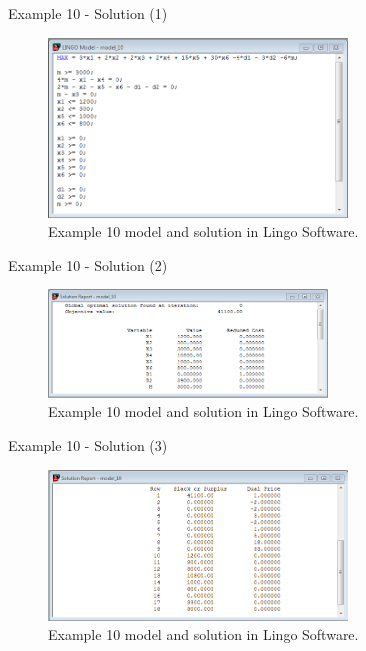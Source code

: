 \begin{frame}{Example 10 - Solution (1)}
\begin{figure}
    \includegraphics[width=300px]{slides/ex10/screenshot_a.png}
    \caption{Example 10 model and solution in Lingo Software.}
\end{figure}
\end{frame}

\begin{frame}{Example 10 - Solution (2)}
\begin{figure}
    \includegraphics[width=280px]{slides/ex10/screenshot_b.png}
    \caption{Example 10 model and solution in Lingo Software.}
\end{figure}
\end{frame}

\begin{frame}{Example 10 - Solution (3)}
\begin{figure}
    \includegraphics[width=300px]{slides/ex10/screenshot_c.png}
    \caption{Example 10 model and solution in Lingo Software.}
\end{figure}
\end{frame}
